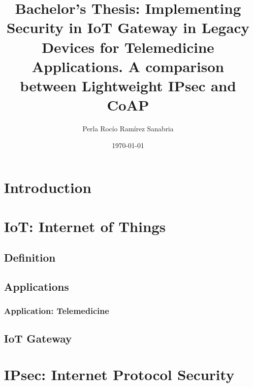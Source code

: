 \documentclass[11pt]{book}
\begin{document}
\renewcommand{\labelitemi}{$\textendash$}
\renewcommand{\labelitemii}{{\tiny$\blacksquare$}}

\title{Bachelor's Thesis: Implementing Security in IoT Gateway in Legacy Devices for Telemedicine Applications. A comparison between Lightweight IPsec and CoAP}
\author{Perla Rocío Ramírez Sanabria}
\date{\small{\today}}
\maketitle

\setcounter{tocdepth}{2}
\tableofcontents
\break

\chapter{Introduction}
\chapter{IoT: Internet of Things}
\section{Definition}
\section{Applications}
\subsection{Application: Telemedicine}
\section{IoT Gateway}
\chapter{IPsec: Internet Protocol Security}
\end{document}
